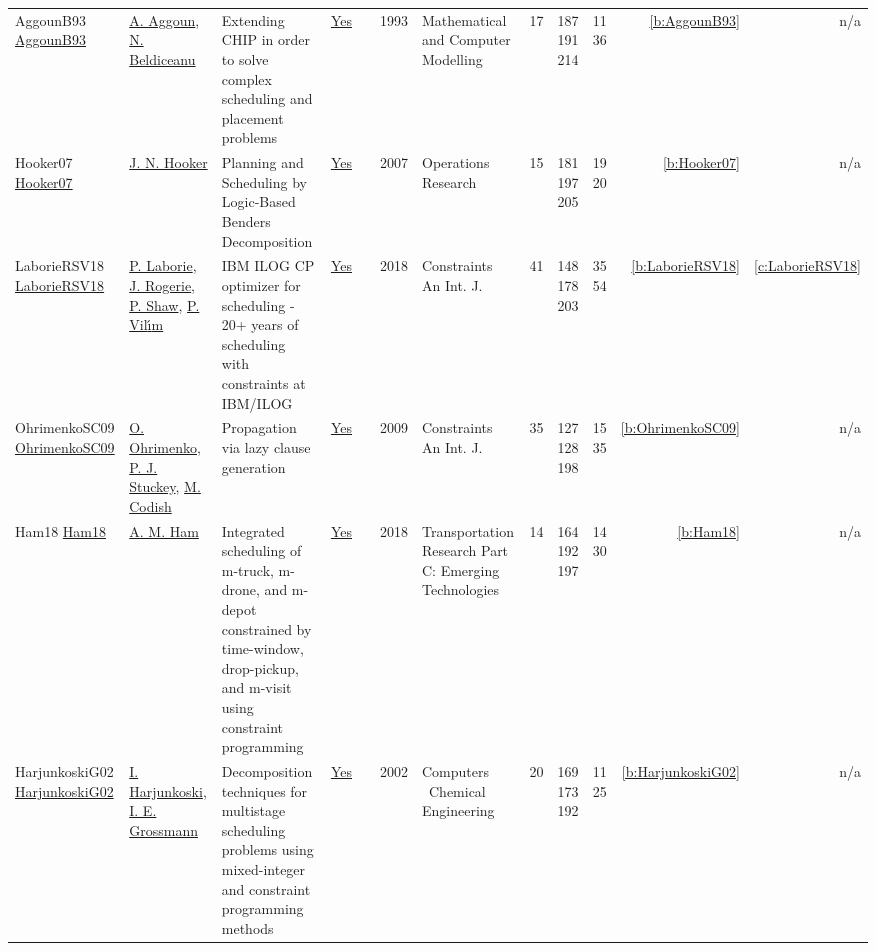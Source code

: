 {\begin{longtable}{>{\raggedright\arraybackslash}p{3cm}>{\raggedright\arraybackslash}p{4.5cm}>{\raggedright\arraybackslash}p{6.0cm}rrrp{2.5cm}rp{1cm}p{1cm}rr}
AggounB93 \href{https://www.sciencedirect.com/science/article/pii/089571779390068A}{AggounB93} & \hyperref[auth:a725]{A. Aggoun}, \hyperref[auth:a128]{N. Beldiceanu} & \cellcolor{gold!20}Extending {CHIP} in order to solve complex scheduling and placement problems & \href{../works/AggounB93.pdf}{Yes} & \cite{AggounB93} & 1993 & Mathematical and Computer Modelling & 17 & 187 191 214 & 11 36 & \ref{b:AggounB93} & n/a\\
Hooker07 \href{http://dx.doi.org/10.1287/opre.1060.0371}{Hooker07} & \hyperref[auth:a160]{J. N. Hooker} & Planning and Scheduling by Logic-Based Benders Decomposition & \href{../works/Hooker07.pdf}{Yes} & \cite{Hooker07} & 2007 & Operations Research & 15 & 181 197 205 & 19 20 & \ref{b:Hooker07} & n/a\\
LaborieRSV18 \href{https://doi.org/10.1007/s10601-018-9281-x}{LaborieRSV18} & \hyperref[auth:a118]{P. Laborie}, \hyperref[auth:a119]{J. Rogerie}, \hyperref[auth:a120]{P. Shaw}, \hyperref[auth:a121]{P. Vil{\'{\i}}m} & {IBM} {ILOG} {CP} optimizer for scheduling - 20+ years of scheduling with constraints at {IBM/ILOG} & \href{../works/LaborieRSV18.pdf}{Yes} & \cite{LaborieRSV18} & 2018 & Constraints An Int. J. & 41 & 148 178 203 & 35 54 & \ref{b:LaborieRSV18} & \ref{c:LaborieRSV18}\\
OhrimenkoSC09 \href{http://dx.doi.org/10.1007/s10601-008-9064-x}{OhrimenkoSC09} & \hyperref[auth:a861]{O. Ohrimenko}, \hyperref[auth:a125]{P. J. Stuckey}, \hyperref[auth:a862]{M. Codish} & Propagation via lazy clause generation & \href{../works/OhrimenkoSC09.pdf}{Yes} & \cite{OhrimenkoSC09} & 2009 & Constraints An Int. J. & 35 & 127 128 198 & 15 35 & \ref{b:OhrimenkoSC09} & n/a\\
Ham18 \href{http://dx.doi.org/10.1016/j.trc.2018.03.025}{Ham18} & \hyperref[auth:a770]{A. M. Ham} & Integrated scheduling of m-truck, m-drone, and m-depot constrained by time-window, drop-pickup, and m-visit using constraint programming & \href{../works/Ham18.pdf}{Yes} & \cite{Ham18} & 2018 & Transportation Research Part C: Emerging Technologies & 14 & 164 192 197 & 14 30 & \ref{b:Ham18} & n/a\\
HarjunkoskiG02 \href{http://dx.doi.org/10.1016/s0098-1354(02)00100-x}{HarjunkoskiG02} & \hyperref[auth:a871]{I. Harjunkoski}, \hyperref[auth:a382]{I. E. Grossmann} & Decomposition techniques for multistage scheduling problems using mixed-integer and constraint programming methods & \href{../works/HarjunkoskiG02.pdf}{Yes} & \cite{HarjunkoskiG02} & 2002 & Computers \  Chemical Engineering & 20 & 169 173 192 & 11 25 & \ref{b:HarjunkoskiG02} & n/a\\

\end{longtable}}
